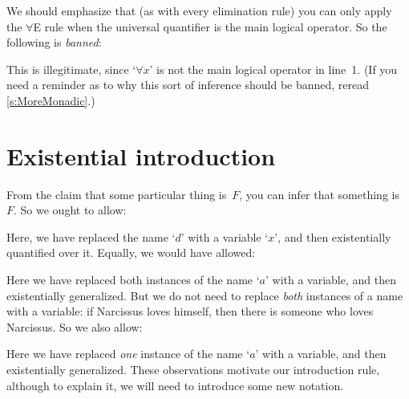 We should emphasize that (as with every elimination rule) you can only apply the $\forall$E rule when the universal quantifier is the main logical operator. So the following is \emph{banned}:
\begin{fitchproof}
	\PR
\end{fitchproof}
This is illegitimate, since `$\forall x$' is not the main logical operator in line~1. (If you need a reminder as to why this sort of inference should be banned, reread \cref{s:MoreMonadic}.)

\section{Existential introduction}\label{s:existsIntro}

From the claim that some particular thing is~$F$, you can infer that something is~$F$. So we ought to allow:
\begin{fitchproof}
	\PR
	 
\end{fitchproof}
Here, we have replaced the name `$d$' with a variable `$x$', and then existentially quantified over it. Equally, we would have allowed:
\begin{fitchproof}
	\PR
	 
\end{fitchproof}
Here we have replaced both instances of the name `$a$' with a variable, and then existentially generalized. But we do not need to replace \emph{both} instances of a name with a variable: if Narcissus loves himself, then there is someone who loves Narcissus. So we also allow:
\begin{fitchproof}
	\PR
	 
\end{fitchproof}
Here we have replaced \emph{one} instance of the name `$a$' with a variable, and then existentially generalized. These observations motivate our introduction rule, although to explain it, we will need to introduce some new notation.

